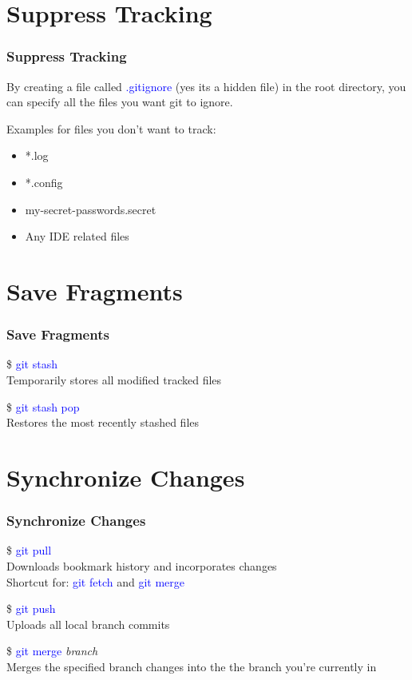 \documentclass[aspectratio=169]{beamer}
\begin{document}
\section{Suppress Tracking}
\begin{frame}

\frametitle{Suppress Tracking}

By creating a file called \textcolor{blue}{.gitignore} (yes its a hidden file) in the root directory, you can specify all the files you want git to ignore.

\pause

Examples for files you don't want to track:

\begin{itemize}

\item *.log
\item *.config
\item my-secret-passwords.secret
\item Any IDE related files

\end{itemize}

\end{frame}

\section{Save Fragments}
\begin{frame}

\frametitle{Save Fragments}

\$ \textcolor{blue}{git stash}\\
Temporarily stores all modified tracked files

\pause

\$ \textcolor{blue}{git stash pop}\\
Restores the most recently stashed files

\end{frame}

\section{Synchronize Changes}
\begin{frame}

\frametitle{Synchronize Changes}

\$ \textcolor{blue}{git pull}\\
Downloads bookmark history and incorporates changes\\
Shortcut for: \textcolor{blue}{git fetch} and \textcolor{blue}{git merge}

\pause

\$ \textcolor{blue}{git push}\\
Uploads all local branch commits

\pause

\$ \textcolor{blue}{git merge} \textit{branch}\\
Merges the specified branch changes into the the branch you're currently in

\end{frame}
\end{document}
